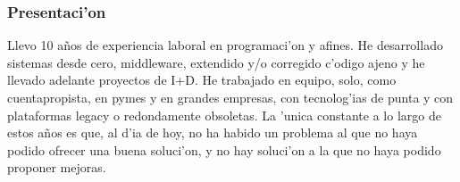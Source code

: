 \subsubsection*{Presentaci'on}
Llevo 10 a\~nos de experiencia laboral en programaci'on y afines.  He desarrollado sistemas desde
cero, middleware, extendido y/o corregido c'odigo ajeno y he llevado adelante proyectos de I+D.  He
trabajado en equipo, solo, como cuentapropista, en pymes y en grandes empresas, con tecnolog'ias de
punta y con plataformas legacy o redondamente obsoletas.  La 'unica constante a lo largo de estos
años es que, al d'ia de hoy, no ha habido un problema al que no haya podido ofrecer una buena
soluci'on, y no hay soluci'on a la que no haya podido proponer mejoras.


